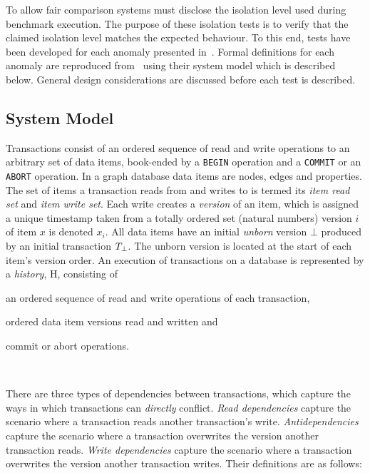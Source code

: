 To allow fair comparison systems must disclose the isolation level used
during benchmark execution. The purpose of these isolation tests is to verify 
that the claimed isolation level matches the expected behaviour. To this end, 
tests have been developed for each anomaly presented 
in~\cite{DBLP:journals/tods/BailisFGHS16}. Formal definitions for each anomaly 
are reproduced from~\cite{adya1999weak,DBLP:journals/tods/BailisFGHS16} using 
their system model which is described below. General design considerations are 
discussed before each test is described.

\subsection{System Model}
\label{sec:system-model}

Transactions consist of an ordered sequence of read and write operations to an
arbitrary set of data items, book-ended by a \texttt{BEGIN} operation and a 
\texttt{COMMIT} or an \texttt{ABORT} operation. In a graph database data items 
are nodes, edges and properties. The set of items a transaction reads from and 
writes to is termed its \emph{item read set} and \emph{item write set}. Each 
write creates a \emph{version} of an item, which is assigned a unique timestamp
taken from a totally ordered set (\eg natural numbers) version $i$ of item $x$ 
is denoted $x_i$. All data items have an initial \emph{unborn} version $\bot$ 
produced by an initial transaction $T_{\bot}$. The unborn version is 
located at the start of each item's version order. An execution of transactions
on a database is represented by a \emph{history}, H, consisting of
\begin{enumerate*}[label={(\roman*)}]
  \item an ordered sequence of read and write operations of each transaction,
  \item ordered data item versions read and written and
  \item commit or abort operations.
\end{enumerate*}~\cite{DBLP:journals/tods/BailisFGHS16}

There are three types of dependencies between transactions, which capture the 
ways in which transactions can \emph{directly} conflict. \emph{Read dependencies} 
capture the scenario where a transaction reads another transaction's write. 
\emph{Antidependencies} capture the scenario where a transaction overwrites the 
version another transaction reads. \emph{Write dependencies} capture the 
scenario where a transaction overwrites the version another transaction writes. 
Their definitions are as follows:

